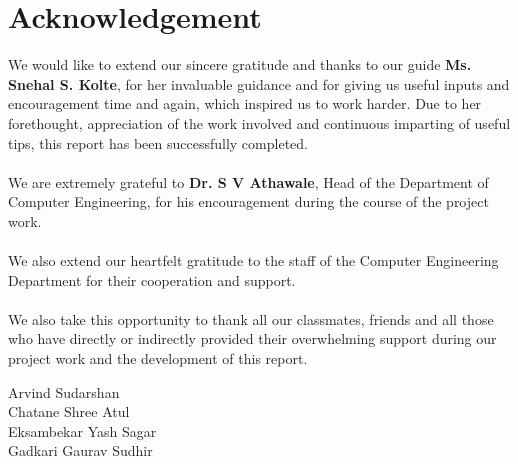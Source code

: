 \documentclass[oneside, 12pt]{book}
\begin{document}
\chapter*{Acknowledgement}
We would like to extend our sincere gratitude and thanks to our guide \textbf{Ms. Snehal S. Kolte}, for her invaluable guidance and for giving us useful inputs and encouragement time and again, which inspired us to work harder. Due to her forethought, appreciation of the work involved and continuous imparting of useful tips, this report has been successfully completed.
\\\\We are extremely grateful to \textbf{Dr. S V Athawale}, Head of the Department of Computer Engineering, for his encouragement during the course of the project work.
\\\\We also extend our heartfelt gratitude to the staff of the Computer Engineering Department for their cooperation and support.
\\\\We also take this opportunity to thank all our classmates, friends and all those who have directly or indirectly provided their overwhelming support during our project work and the development of this report.\break\break\break\break\break\break\break\break

\begin{flushright}
	Arvind Sudarshan\\
	Chatane Shree Atul\\
	Eksambekar Yash Sagar\\
	Gadkari Gaurav Sudhir
\end{flushright}
\end{document}
